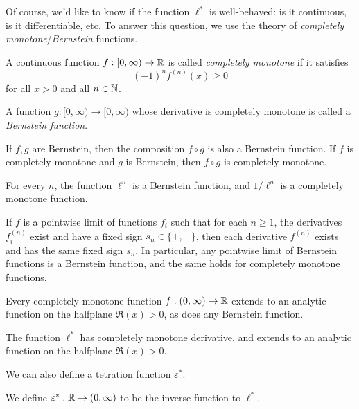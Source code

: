 \documentclass[letterpaper,11pt]{article}
\begin{document}
Of course, we'd like to know if the function $\ell^*$ is well-behaved: is it continuous, is it differentiable, etc. To answer this question, we use the theory of \emph{completely monotone}/\emph{Bernstein} functions.

\begin{defn} A continuous function $f : [0,\infty) \rightarrow \mathbb{R}$ is called \emph{completely monotone} if it satisfies
\[
(-1)^nf^{(n)}(x) \ge 0
\]
for all $x > 0$ and all $n \in \mathbb{N}$.

A function $g : [0,\infty) \rightarrow [0,\infty)$ whose derivative is completely monotone is called a \emph{Bernstein function}.
\end{defn}

\begin{prop} If $f,g$ are Bernstein, then the composition $f \circ g$ is also a Bernstein function. If $f$ is completely monotone and $g$ is Bernstein, then $f \circ g$ is completely monotone.
\end{prop}

\begin{cor} For every $n$, the function $\ell^n$ is a Bernstein function, and $1/\ell^n$ is a completely monotone function.
\end{cor}

\begin{prop} If $f$ is a pointwise limit of functions $f_i$ such that for each $n \ge 1$, the derivatives $f_i^{(n)}$ exist and have a fixed sign $s_n \in \{+,-\}$, then each derivative $f^{(n)}$ exists and has the same fixed sign $s_n$. In particular, any pointwise limit of Bernstein functions is a Bernstein function, and the same holds for completely monotone functions.
\end{prop}

\begin{prop} Every completely monotone function $f : (0,\infty) \rightarrow \mathbb{R}$ extends to an analytic function on the halfplane $\Re(x) > 0$, as does any Bernstein function.
\end{prop}

\begin{cor} The function $\ell^*$ has completely monotone derivative, and extends to an analytic function on the halfplane $\Re(x) > 0$.
\end{cor}

We can also define a tetration function $\varepsilon^*$.

\begin{defn} We define $\varepsilon^* : \mathbb{R} \rightarrow (0,\infty)$ to be the inverse function to $\ell^*$.
\end{defn}
\end{document}
